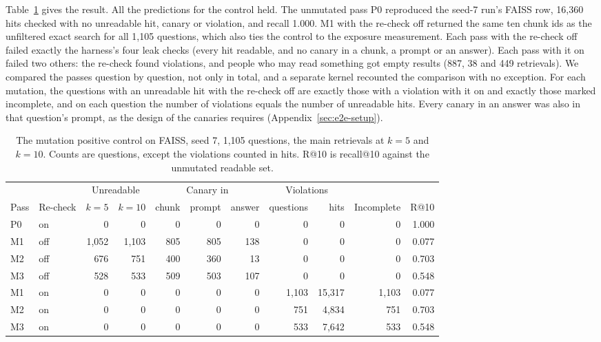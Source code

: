 Table~\ref{tab:e2e-control} gives the result. All the predictions for the control held. The unmutated pass P0 reproduced the seed-7
run's FAISS row, 16,360 hits checked with no unreadable hit, canary or violation, and recall 1.000.
M1 with the re-check off returned the same ten chunk ids as the unfiltered exact search for all 1,105 questions, which also ties the
control to the exposure measurement. Each pass with the re-check off failed exactly the harness's four leak checks (every hit readable, and no canary in a
chunk, a prompt or an answer). Each pass with it on failed two others: the re-check found violations, and people who may read something got
empty results (887, 38 and 449 retrievals).
We compared the passes question by question, not only in total, and a separate kernel recounted the comparison with no exception. For each mutation, the questions with an unreadable hit
with the re-check off are exactly those with a violation with it on and exactly those marked incomplete, and on
each question the number of violations equals the number of unreadable hits. Every canary in an answer was also in that question's
prompt, as the design of the canaries requires (Appendix~\ref{sec:e2e-setup}).

\begin{table}[tbp]
\centering
\footnotesize\setlength{\tabcolsep}{3.5pt}
\begin{tabular}{@{}llrrrrrrrrr@{}}
\toprule
 & & \multicolumn{2}{c}{Unreadable} & \multicolumn{3}{c}{Canary in} & \multicolumn{2}{c}{Violations} & & \\
\cmidrule(lr){3-4}\cmidrule(lr){5-7}\cmidrule(lr){8-9}
Pass & Re-check & $k{=}5$ & $k{=}10$ & chunk & prompt & answer & questions & hits & Incomplete & R@10 \\
\midrule
P0 & on & 0 & 0 & 0 & 0 & 0 & 0 & 0 & 0 & 1.000 \\
\midrule
M1 & off & 1,052 & 1,103 & 805 & 805 & 138 & 0 & 0 & 0 & 0.077 \\
M2 & off & 676 & 751 & 400 & 360 & 13 & 0 & 0 & 0 & 0.703 \\
M3 & off & 528 & 533 & 509 & 503 & 107 & 0 & 0 & 0 & 0.548 \\
\midrule
M1 & on & 0 & 0 & 0 & 0 & 0 & 1,103 & 15,317 & 1,103 & 0.077 \\
M2 & on & 0 & 0 & 0 & 0 & 0 & 751 & 4,834 & 751 & 0.703 \\
M3 & on & 0 & 0 & 0 & 0 & 0 & 533 & 7,642 & 533 & 0.548 \\
\bottomrule
\end{tabular}
\caption{The mutation positive control on FAISS, seed 7, 1,105 questions, the main retrievals at $k = 5$ and $k = 10$.
Counts are questions, except the violations counted in hits. R@10 is recall@10 against the unmutated readable set.}
\label{tab:e2e-control}
\end{table}

